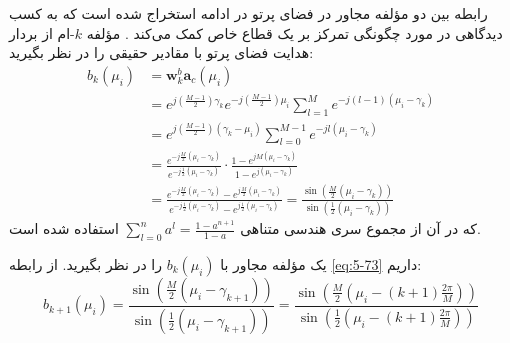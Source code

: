رابطه بین دو مؤلفه مجاور در فضای پرتو در ادامه استخراج شده است که به کسب دیدگاهی در مورد چگونگی تمرکز بر یک قطاع خاص کمک می‌کند \cite{5-12}. مؤلفه $k$-ام از بردار هدایت فضای پرتو  با مقادیر حقیقی را در نظر بگیرید:
\begin{align}
	b_k(\mu_i) &= \bm{w}_k^b \bm{a}_c(\mu_i) \nonumber \\
	&= e^{j\left(\frac{M-1}{2}\right)\gamma_k} e^{-j\left(\frac{M-1}{2}\right)\mu_i} \sum_{l=1}^{M} e^{-j(l-1)(\mu_i - \gamma_k)} \nonumber \\
	&= e^{j\left(\frac{M-1}{2}\right)(\gamma_k - \mu_i)} \sum_{l=0}^{M-1} e^{-jl(\mu_i - \gamma_k)} \label{eq:5-73} \\
	&= \frac{e^{-j\frac{M}{2}(\mu_i - \gamma_k)}}{e^{-j\frac{1}{2}(\mu_i - \gamma_k)}} \cdot \frac{1 - e^{jM(\mu_i - \gamma_k)}}{1 - e^{j(\mu_i - \gamma_k)}} \nonumber \\
	&= \frac{e^{-j\frac{M}{2}(\mu_i - \gamma_k)} - e^{j\frac{M}{2}(\mu_i - \gamma_k)}}{e^{-j\frac{1}{2}(\mu_i - \gamma_k)} - e^{j\frac{1}{2}(\mu_i - \gamma_k)}} = \frac{\sin\left(\frac{M}{2}(\mu_i - \gamma_k)\right)}{\sin\left(\frac{1}{2}(\mu_i - \gamma_k)\right)} \nonumber
\end{align}
که در آن از مجموع سری هندسی متناهی $\sum_{l=0}^{n} a^l = \frac{1 - a^{n+1}}{1 - a}$ استفاده شده است.

یک مؤلفه مجاور با $b_k(\mu_i)$ را در نظر بگیرید. از رابطه \eqref{eq:5-73} داریم:
\begin{equation}
	b_{k+1}(\mu_i) = \frac{\sin\left(\frac{M}{2}(\mu_i - \gamma_{k+1})\right)}{\sin\left(\frac{1}{2}(\mu_i - \gamma_{k+1})\right)} = \frac{\sin\left(\frac{M}{2}\left(\mu_i - (k+1)\frac{2\pi}{M}\right)\right)}{\sin\left(\frac{1}{2}\left(\mu_i - (k+1)\frac{2\pi}{M}\right)\right)}
	\label{eq:5-74}
\end{equation}





